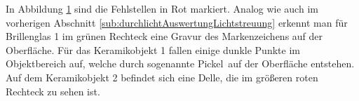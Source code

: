 {
	\begin{figure}[H]
		\centering
		
		\label{tikz:abbNachbearbeitungSpLichtstreuung}
	\end{figure}
}

\noindent
In Abbildung \ref{tikz:abbNachbearbeitungSpLichtstreuung} sind die Fehlstellen in Rot markiert. 
Analog wie auch im vorherigen Abschnitt \ref{sub:durchlichtAuswertungLichtstreuung} erkennt man für Brillenglas 1 im grünen Rechteck eine Gravur des Markenzeichens auf der Oberfläche.
Für das Keramikobjekt 1 fallen einige dunkle Punkte im Objektbereich auf, welche durch sogenannte \glqq Pickel\grqq ~auf der Oberfläche entstehen.
Auf dem Keramikobjekt 2 befindet sich eine Delle, die im größeren roten Rechteck zu sehen ist.